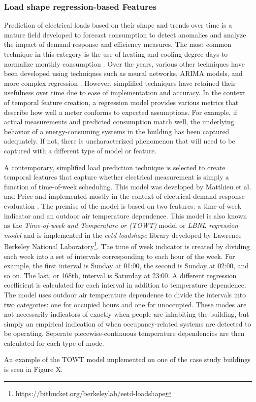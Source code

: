 \subsubsection{Load shape regression-based Features}
\label{sec:regressionmetrics}

Prediction of electrical loads based on their shape and trends over time is a mature field developed to forecast consumption to detect anomalies and analyze the impact of demand response and efficiency measures. The most common technique in this category is the use of heating and cooling degree days to normalize monthly consumption \cite{fels_prism:_1986}. Over the years, various other techniques have been developed using techniques such as neural networks, ARIMA models, and more complex regression \cite{taylor_comparison_2006}. However, simplified techniques have retained their usefulness over time due to ease of implementation and accuracy. In the context of temporal feature creation, a regression model provides various metrics that describe how well a meter conforms to expected assumptions. For example, if actual measurements and predicted consumption match well, the underlying behavior of a energy-consuming systems in the building has been captured adequately. If not, there is uncharacterized phenomenon that will need to be captured with a different type of model or feature. 

A contemporary, simplified load prediction technique is selected to create temporal features that capture whether electrical measurement is simply a function of time-of-week scheduling. This model was developed by Matthieu et al. and Price and implemented mostly in the context of electrical demand response evaluation \cite{price_methods_2010, mathieu_quantifying_2011}. The premise of the model is based on two features: a time-of-week indicator and an outdoor air temperature dependence. This model is also known as the \emph{Time-of-week and Temperature or (TOWT)} model or \emph{LBNL regression model} and is implemented in the \emph{eetd-loadshape} library developed by Lawrence Berkeley National Laboratory\footnote{https://bitbucket.org/berkeleylab/eetd-loadshape}. The time of week indicator is created by dividing each week into a set of intervals corresponding to each hour of the week. For example, the first interval is Sunday at 01:00, the second is Sunday at 02:00, and so on. The last, or 168th, interval is Saturday at 23:00. A different regression coefficient is calculated for each interval in addition to temperature dependence. The model uses outdoor air temperature dependence to divide the intervals into two categories: one for occupied hours and one for unoccupied. These modes are not necessarily indicators of exactly when people are inhabiting the building, but simply an empirical indication of when occupancy-related systems are detected to be operating. Seperate piecewise-continuous temperature dependencies are then calculated for each type of mode.

An example of the TOWT model implemented on one of the case study buildings is seen in Figure X. 